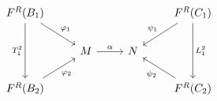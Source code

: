 \documentclass{article}
\begin{document}
    \begin{equation*}
        \begin{tikzcd}
            F^R\!\l(B_1\r) \ar[dr, "\phi_1"] \ar[dd, "T_1^2"'] & & & F^R\!\l(C_1\r) \ar[dl, "\psi_1"'] \ar[dd, "L_1^2"] \\
            & M \ar[r, "\alpha"] & N \\
            F^R\!\l(B_2\r) \ar[ur, "\phi_2"'] & & & F^R\!\l(C_2\r) \ar[ul, "\psi_2"]
        \end{tikzcd}
    \end{equation*}
\end{document}
